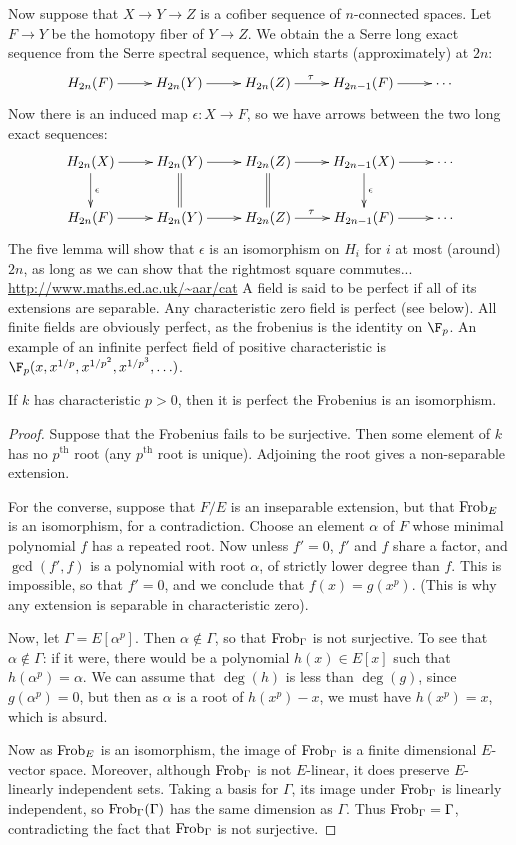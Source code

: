 \documentclass[11pt]{article}
\begin{document}
Now suppose that $X\to Y\to Z$ is a cofiber sequence of $n$-connected spaces.
Let $F\to Y$ be the homotopy fiber of $Y\to Z$. We obtain the a Serre long exact
sequence from the Serre spectral sequence, which starts (approximately) at $2n$:
\[\xymatrix{
H_{2n}(F)\ar[r]&H_{2n}(Y)\ar[r]&H_{2n}(Z)\ar[r]^{\tau\ \ }&
H_{2n-1}(F)\ar[r]&\cdots
}\]
Now there is an induced map $\epsilon:X\to F$, so we have arrows between the two
long exact sequences:
\[\xymatrix{
H_{2n}(X)\ar[r]\ar[d]^\epsilon&H_{2n}(Y)\ar[r]\ar@{=}[d]&
H_{2n}(Z)\ar[r]^{\ \ }\ar@{=}[d]&H_{2n-1}(X)\ar[r]\ar[d]^\epsilon&\cdots\\
H_{2n}(F)\ar[r]&H_{2n}(Y)\ar[r]&H_{2n}(Z)\ar[r]^{\tau\ \ }&
H_{2n-1}(F)\ar[r]&\cdots
}\]
The five lemma will show that $\epsilon$ is an isomorphism on $H_{i}$ for $i$ at
most (around) $2n$, as long as we can show that the rightmost square commutes...
\url{http://www.maths.ed.ac.uk/~aar/cat}
A field is said to be perfect if all of its extensions are separable. Any
characteristic zero field is perfect (see below). All finite fields are
obviously perfect, as the frobenius is the identity on $\F_p$. An example of an
infinite perfect field of positive characteristic is
$\F_p(x,x^{1/p},x^{1/p^2},x^{1/p^3},\ldots)$.

\begin{fact*}If $k$ has characteristic $p>0$, then it
is perfect \Iff the Frobenius is an isomorphism.\end{fact*}
\begin{proof}
Suppose that the Frobenius fails to be surjective. Then some element of $k$ has
no $p^\text{th}$ root (any $p^\text{th}$ root is unique). Adjoining the root
gives a non-separable extension.

For the converse, suppose that $F/E$ is an inseparable extension, but that
$\operatorname{Frob}_E$ is an isomorphism, for a contradiction. Choose an element $\alpha$ of
$F$ whose minimal polynomial $f$ has a repeated root. Now unless $f'=0$, $f'$
and $f$ share a factor, and $\gcd(f',f)$ is a polynomial with root $\alpha$, of
strictly lower degree than $f$. This is impossible, so that $f'=0$, and we
conclude that $f(x)=g(x^p)$. (This is why any extension is separable in
characteristic zero).

Now, let $\Gamma=E[\alpha^p]$. Then $\alpha\notin\Gamma$, so that $\operatorname{Frob}_\Gamma$
is not surjective. To see that $\alpha\notin\Gamma$: if it were, there would be
a polynomial $h(x)\in E[x]$ such that $h(\alpha^p)=\alpha$. We can assume that
$\deg(h)$ is less than $\deg(g)$, since $g(\alpha^p)=0$, but then as $\alpha$ is
a root of $h(x^p)-x$, we must have $h(x^p)=x$, which is absurd.

Now as $\operatorname{Frob}_E$ is an isomorphism, the image of $\operatorname{Frob}_\Gamma$ is a finite
dimensional $E$-vector space. Moreover, although $\operatorname{Frob}_\Gamma$ is not
$E$-linear, it does preserve $E$-linearly independent sets. Taking a basis for
$\Gamma$, its image under $\operatorname{Frob}_\Gamma$ is linearly independent, so
$\operatorname{Frob}_\Gamma(\Gamma)$ has the same dimension as $\Gamma$. Thus
$\operatorname{Frob}_\Gamma=\Gamma$, contradicting the fact that $\operatorname{Frob}_\Gamma$ is not
surjective.
\end{proof}
\end{document}
